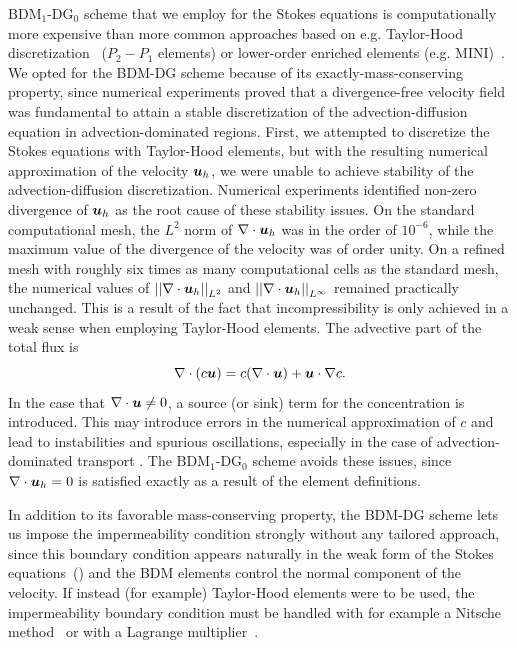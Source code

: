 \documentclass{WileyMSP-template}
\providecommand{\DIFadd}[1]{{\protect\color{blue}\uwave{#1}}} %
\providecommand{\DIFaddend}{} %
\begin{document}
\DIFadd{The }\DIFaddend $\mathrm{BDM}_1$-$\mathrm{DG}_0$ scheme that we employ for the Stokes equations
is computationally more expensive than more common approaches based on
e.g. Taylor-Hood discretization~\cite{Stenberg1990ErrorProblem}
($P_2-P_1$ elements) or lower-order enriched
elements (e.g. MINI)~\cite{Brezzi2011MixedMethods}.
We opted for the BDM-DG scheme because of its exactly-mass-conserving property,
since numerical experiments proved that a divergence-free velocity field was
fundamental to attain a stable discretization of the advection-diffusion equation
in advection-dominated regions. First, we attempted
to discretize the Stokes equations with 
Taylor-Hood elements, but with the resulting numerical approximation
of the velocity $\bm{u}_h$, we were unable to achieve
stability of the advection-diffusion discretization.
Numerical experiments identified non-zero divergence of $\bm{u}_h$
as the root cause of these stability issues.
On the standard computational mesh, the $L^2$ norm of $\nabla\cdot\bm{u}_h$ was
in the order of $10^{-6}$, while the
maximum value of the divergence of the velocity was of order unity.
On a refined mesh with roughly six times as many
computational cells as the standard mesh, the numerical values of
${\vert\vert\nabla\cdot\bm{u}_h\vert\vert}_{L^2}$ and ${\vert\vert\nabla\cdot\bm{u}_h\vert\vert}_{L^{\infty}}$
remained practically unchanged. This is a result
of the fact that incompressibility is only achieved in a weak sense when
employing Taylor-Hood elements. The advective part of the total flux
is
\begin{equation*}
    \nabla\cdot(c\bm{u}) = c(\nabla\cdot\bm{u}) + \bm{u}\cdot\nabla c.
\end{equation*}
In the case that $\nabla\cdot\bm{u}\neq 0$, a source (or sink) term for the concentration
is introduced. This may introduce errors in the numerical approximation of $c$
and lead to instabilities and spurious oscillations, especially in the case of
advection-dominated transport
\cite{gresho1998incompressible, cesmelioglu2022compatible, johnson2009numerical}.
The $\mathrm{BDM}_1$-$\mathrm{DG}_0$ scheme avoids these issues,
since $\nabla\cdot\bm{u}_h=0$ is satisfied exactly as a result of the element definitions.

In addition to its favorable mass-conserving property, the BDM-DG scheme
lets us impose the impermeability condition strongly without any tailored approach,
since this boundary condition appears naturally in the weak form of the
Stokes equations~() and the BDM elements control
the normal component of the velocity. If instead (for example) Taylor-Hood
elements were to be used, the impermeability boundary condition must
be handled with for example a Nitsche method~\cite{Nitsche1971UberSind}
or with a Lagrange multiplier~\cite{Babuska1973TheMultipliers,
Bertoluzza2017BoundaryHemodynamics}.
\end{document}
